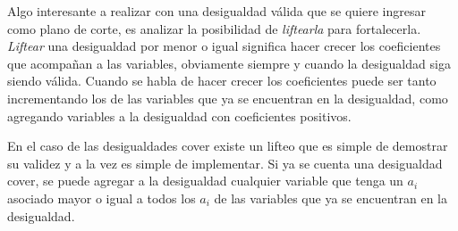 Algo interesante a realizar con una desigualdad v\'alida que se quiere ingresar como plano de corte, es analizar la posibilidad de \emph{liftearla} para fortalecerla. \emph{Liftear} una desigualdad por menor o igual significa hacer crecer los coeficientes que acompa\~nan a las variables, obviamente siempre y cuando la desigualdad siga siendo v\'alida. Cuando se habla de hacer crecer los coeficientes puede ser tanto incrementando los de las variables que ya se encuentran en la desigualdad, como agregando variables a la desigualdad con coeficientes positivos.


En el caso de las desigualdades cover existe un lifteo que es simple de demostrar su validez y a la vez es simple de implementar. Si ya se cuenta una desigualdad cover, se puede agregar a la desigualdad cualquier variable que tenga un $a_i$ asociado mayor o igual a todos los $a_i$ de las variables que ya se encuentran en la desigualdad.

